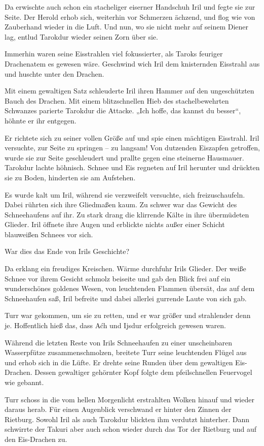 Da erwischte auch schon ein stacheliger eiserner Handschuh Iril und fegte sie zur Seite. Der Herold erhob sich, weiterhin vor Schmerzen ächzend, und flog wie von Zauberhand wieder in die Luft. Und nun, wo sie nicht mehr auf seinem Diener lag, entlud Tarokdur wieder seinen Zorn über sie.

Immerhin waren seine Eisstrahlen viel fokussierter, als Taroks feuriger Drachenatem es gewesen wäre. Geschwind wich Iril dem knisternden Eisstrahl aus und huschte unter den Drachen.

Mit einem gewaltigen Satz schleuderte Iril ihren Hammer auf den ungeschützten Bauch des Drachen. Mit einem blitzschnellen Hieb des stachelbewehrten Schwanzes parierte Tarokdur die Attacke. „Ich hoffe, das kannst du besser“, höhnte er ihr entgegen.

Er richtete sich zu seiner vollen Größe auf und spie einen mächtigen Eisstrahl. Iril versuchte, zur Seite zu springen – zu langsam! Von dutzenden Eiszapfen getroffen, wurde sie zur Seite geschleudert und prallte gegen eine steinerne Hausmauer. Tarokdur lachte höhnisch. Schnee und Eis regneten auf Iril herunter und drückten sie zu Boden, hinderten sie am Aufstehen.

Es wurde kalt um Iril, während sie verzweifelt versuchte, sich freizuschaufeln. Dabei rührten sich ihre Gliedmaßen kaum. Zu schwer war das Gewicht des Schneehaufens auf ihr. Zu stark drang die klirrende Kälte in ihre übermüdeten Glieder. Iril öffnete ihre Augen und erblickte nichts außer einer Schicht blauweißen Schnees vor sich.

War dies das Ende von Irils Geschichte?

Da erklang ein freudiges Kreischen. Wärme durchfuhr Irils Glieder. Der weiße Schnee vor ihrem Gesicht schmolz beiseite und gab den Blick frei auf ein wunderschönes goldenes Wesen, von leuchtenden Flammen übersät, das auf dem Schneehaufen saß, Iril befreite und dabei allerlei gurrende Laute von sich gab.

Turr war gekommen, um sie zu retten, und er war größer und strahlender denn je. Hoffentlich hieß das, dass Aćh und Ijsdur erfolgreich gewesen waren.

Während die letzten Reste von Irils Schneehaufen zu einer unscheinbaren Wasserpfütze zusammenschmolzen, breitete Turr seine leuchtenden Flügel aus und erhob sich in die Lüfte. Er drehte seine Runden über dem gewaltigen Eis-Drachen. Dessen gewaltiger gehörnter Kopf folgte dem pfeilschnellen Feuervogel wie gebannt.

Turr schoss in die vom hellen Morgenlicht erstrahlten Wolken hinauf und wieder daraus herab. Für einen Augenblick verschwand er hinter den Zinnen der Rietburg. Sowohl Iril als auch Tarokdur blickten ihm verdutzt hinterher. Dann schwirrte der Takuri aber auch schon wieder durch das Tor der Rietburg und auf den Eis-Drachen zu.

